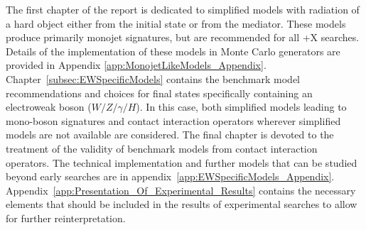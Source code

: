 The first chapter of the report is dedicated to simplified
models with radiation of a hard object either from the initial state
or from the mediator. These models produce primarily monojet signatures, 
but are recommended for all \MET{}+X searches.
Details of the implementation of these models in
Monte Carlo generators are provided in
Appendix \ref{app:MonojetLikeModels_Appendix}.
Chapter~\ref{subsec:EWSpecificModels} contains the benchmark model
recommendations and choices for final states specifically containing an electroweak 
boson ($W/Z/\gamma/H$). In this case, both
simplified models leading to mono-boson signatures
and contact interaction operators wherever simplified models are not available are considered. 
The final chapter is devoted to the treatment of the validity of benchmark
models from contact interaction operators.
The technical implementation and further models that can be studied
beyond early searches are in appendix~\ref{app:EWSpecificModels_Appendix}. 
Appendix~\ref{app:Presentation_Of_Experimental_Results} contains the necessary elements that
should be included in the results of experimental searches to allow for further reinterpretation. 


